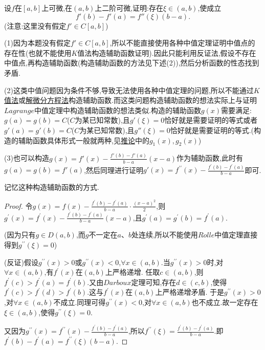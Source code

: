 \documentclass[lang=cn,newtx,10pt,scheme=chinese]{../Template/elegantbook}
\begin{document}
\begin{proposition}\label{pro:Lagrange中值定理的推广(二阶导数)}
    设\(f\)在\([a,b]\)上可微,在\((a,b)\)上二阶可微,证明:存在\(\xi\in(a,b)\),使成立
    \[
    f'(b) - f'(a) = f''(\xi)(b - a).
    \]
    (注意:这里没有假定\(f'\in C[a,b]\))
\end{proposition}
\begin{note}
    (1)因为本题没有假定\(f'\in C[a,b]\),所以不能直接使用各种中值定理证明中值点的存在性(也就不能使用$K$值法构造辅助函数证明).因此只能利用反证法,假设不存在中值点,再构造辅助函数(构造辅助函数的方法见下述(2)),然后分析函数的性态找到矛盾.

    (2)这类中值问题因为条件不够,导致无法使用各种中值定理的问题,所以不能通过\hyperlink{a}{$K$值法}或\hyperlink{a}{解微分方程法}构造辅助函数.而这类问题构造辅助函数的想法实际上与证明$Lagrange$中值定理中构造辅助函数的想法类似.构造的辅助函数$g(x)$需要满足:$g(a)=g(b)=C$($C$为某已知常数),且$g'(\xi)=0$恰好就是需要证明的等式或者$g'(a)=g'(b)=C$($C$为某已知常数),且$g''(\xi)=0$恰好就是需要证明的等式.(构造的辅助函数具体形式一般就两种,见\hyperref[cor:Lagrange中值定理的推广(k+1阶导数)]{推论}中的$g_1(x),g_2(x)$)

    (3)也可以构造$g\left( x \right) =f'\left( x \right) -\frac{f'\left( b \right) -f'\left( a \right)}{b-a}\left( x-a \right)$作为辅助函数,此时有$g(a)=g(b)=f'(a)$,然后同理进行证明$g'(x)=f^{\prime\prime}(x) - \frac{f^{\prime}(b) - f^{\prime}(a)}{b - a}$即可.
\end{note}
\begin{remark}
    记忆这种构造辅助函数的方式.
\end{remark}
\begin{proof}\label{proof:Lagrange中值定理的推广(二阶导数)-证明}
    令\(g(x) = f(x) - \frac{f^{\prime}(b) - f^{\prime}(a)}{b - a} \cdot \frac{(x - a)^2}{2}\),则\(g^{\prime}(x) = f^{\prime}(x) - \frac{f^{\prime}(b) - f^{\prime}(a)}{b - a}(x - a)\),且\(g^{\prime}(a) = g^{\prime}(b) = f^{\prime}(a)\).

(因为只有\(g\in D(a,b)\),而\(g\)不一定在\(a\)、\(b\)处连续,所以不能使用\(Rolle\)中值定理直接得到\(g^{\prime\prime}(\xi) = 0\))

(反证)假设\(g^{\prime\prime}(x) > 0\)或\(g^{\prime\prime}(x) < 0\),\(\forall x\in (a,b)\).当\(g^{\prime\prime}(x) > 0\)时,对\(\forall x\in (a,b)\),有\(f^{\prime}(x)\)在\((a,b)\)上严格递增.
任取\(c\in (a,b)\),则\(f^{\prime}(c) > f^{\prime}(a) = f^{\prime}(b)\).又由\(Darboux\)定理可知,存在\(d\in (c,b)\),使得\(f^{\prime}(c) > f^{\prime}(d) > f^{\prime}(b)\).这与\(f^{\prime}(x)\)在\((a,b)\)上严格递增矛盾.
于是\(g^{\prime\prime}(x) > 0\),对\(\forall x\in (a,b)\)不成立.同理可得\(g^{\prime\prime}(x) < 0\),对\(\forall x\in (a,b)\)也不成立.故一定存在\(\xi \in (a,b)\),使得\(g^{\prime\prime}(\xi) = 0\).

又因为\(g^{\prime\prime}(x) = f^{\prime\prime}(x) - \frac{f^{\prime}(b) - f^{\prime}(a)}{b - a}\),所以\(f^{\prime\prime}(\xi) = \frac{f^{\prime}(b) - f^{\prime}(a)}{b - a}\).即\(f^{\prime}(b) - f^{\prime}(a) = f^{\prime\prime}(\xi)(b - a)\).

\end{proof}
\end{document}
